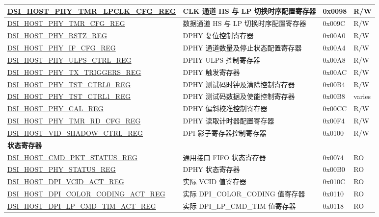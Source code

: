 \begin{longtable}{ | p{6.8cm} | p{6.8cm} | p{1.2cm} | p{1cm} | }
\hyperref[regdesc:DSIHOSTPHYTMRLPCLKCFGREG]{DSI\_HOST\_PHY\_TMR\_LPCLK\_CFG\_REG} & CLK 通道 HS 与 LP 切换时序配置寄存器 & 0x0098 & R/W \\ \hline
\hyperref[regdesc:DSIHOSTPHYTMRCFGREG]{DSI\_HOST\_PHY\_TMR\_CFG\_REG} & 数据通道 HS 与 LP 切换时序配置寄存器 & 0x009C & R/W \\ \hline
\hyperref[regdesc:DSIHOSTPHYRSTZREG]{DSI\_HOST\_PHY\_RSTZ\_REG} & DPHY 复位控制寄存器 & 0x00A0 & R/W \\ \hline
\hyperref[regdesc:DSIHOSTPHYIFCFGREG]{DSI\_HOST\_PHY\_IF\_CFG\_REG} & DPHY 通道数量及停止状态配置寄存器 & 0x00A4 & R/W \\ \hline
\hyperref[regdesc:DSIHOSTPHYULPSCTRLREG]{DSI\_HOST\_PHY\_ULPS\_CTRL\_REG} & DPHY ULPS 控制寄存器 & 0x00A8 & R/W \\ \hline
\hyperref[regdesc:DSIHOSTPHYTXTRIGGERSREG]{DSI\_HOST\_PHY\_TX\_TRIGGERS\_REG} & DPHY 触发寄存器 & 0x00AC & R/W \\ \hline
\hyperref[regdesc:DSIHOSTPHYTSTCTRL0REG]{DSI\_HOST\_PHY\_TST\_CTRL0\_REG} & DPHY 测试码时钟及清除控制寄存器 & 0x00B4 & R/W \\ \hline
\hyperref[regdesc:DSIHOSTPHYTSTCTRL1REG]{DSI\_HOST\_PHY\_TST\_CTRL1\_REG} & DPHY 测试码数据及使能控制寄存器 & 0x00B8 & varies \\ \hline
\hyperref[regdesc:DSIHOSTPHYCALREG]{DSI\_HOST\_PHY\_CAL\_REG} & DPHY 偏斜校准控制寄存器 & 0x00CC & R/W \\ \hline
\hyperref[regdesc:DSIHOSTPHYTMRRDCFGREG]{DSI\_HOST\_PHY\_TMR\_RD\_CFG\_REG} & DPHY 读取计时器配置寄存器 & 0x00F4 & R/W \\ \hline
\hyperref[regdesc:DSIHOSTVIDSHADOWCTRLREG]{DSI\_HOST\_VID\_SHADOW\_CTRL\_REG} & DPI 影子寄存器控制寄存器 & 0x0100 & R/W \\ \hline
\multicolumn{4}{|l|}{\textbf{状态寄存器}} \\ \hline
\hyperref[regdesc:DSIHOSTCMDPKTSTATUSREG]{DSI\_HOST\_CMD\_PKT\_STATUS\_REG} & 通用接口 FIFO 状态寄存器 & 0x0074 & RO \\ \hline
\hyperref[regdesc:DSIHOSTPHYSTATUSREG]{DSI\_HOST\_PHY\_STATUS\_REG} & DPHY 状态寄存器 & 0x00B0 & RO \\ \hline
\hyperref[regdesc:DSIHOSTDPIVCIDACTREG]{DSI\_HOST\_DPI\_VCID\_ACT\_REG} & 实际 VCID 值寄存器 & 0x010C & RO \\ \hline
\hyperref[regdesc:DSIHOSTDPICOLORCODINGACTREG]{DSI\_HOST\_DPI\_COLOR\_CODING\_ACT\_REG} & 实际 DPI\_COLOR\_CODING 值寄存器 & 0x0110 & RO \\ \hline
\hyperref[regdesc:DSIHOSTDPILPCMDTIMACTREG]{DSI\_HOST\_DPI\_LP\_CMD\_TIM\_ACT\_REG} & 实际 DPI\_LP\_CMD\_TIM 值寄存器 & 0x0118 & RO \\ \hline

\end{longtable}
